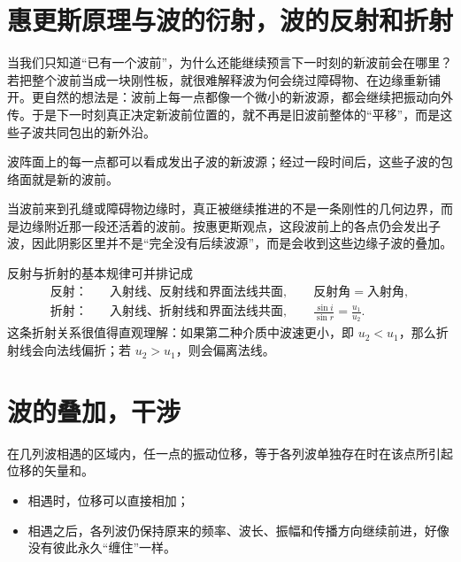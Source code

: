 \documentclass[lang=cn,11pt]{elegantbook}
\begin{document}
\section{惠更斯原理与波的衍射，波的反射和折射}

 当我们只知道“已有一个波前”，为什么还能继续预言下一时刻的新波前会在哪里？若把整个波前当成一块刚性板，就很难解释波为何会绕过障碍物、在边缘重新铺开。更自然的想法是：波前上每一点都像一个微小的新波源，都会继续把振动向外传。于是下一时刻真正决定新波前位置的，就不再是旧波前整体的“平移”，而是这些子波共同包出的新外沿。

\begin{theorem}[惠更斯原理]
波阵面上的每一点都可以看成发出子波的新波源；经过一段时间后，这些子波的包络面就是新的波前。
\end{theorem}

 当波前来到孔缝或障碍物边缘时，真正被继续推进的不是一条刚性的几何边界，而是边缘附近那一段还活着的波前。按惠更斯观点，这段波前上的各点仍会发出子波，因此阴影区里并不是“完全没有后续波源”，而是会收到这些边缘子波的叠加。

\begin{theorem}[波的反射和折射]
反射与折射的基本规律可并排记成
\[
\begin{aligned}
\text{反射：}\quad &\text{入射线、反射线和界面法线共面},\qquad \text{反射角}=\text{入射角},\\
\text{折射：}\quad &\text{入射线、折射线和界面法线共面},\qquad \frac{\sin i}{\sin r}=\frac{u_1}{u_2}.
\end{aligned}
\]这条折射关系很值得直观理解：如果第二种介质中波速更小，即 \(u_2<u_1\)，那么折射线会向法线偏折；若 \(u_2>u_1\)，则会偏离法线。
\end{theorem}


\section{波的叠加，干涉}

\begin{definition}[波的叠加原理]
在几列波相遇的区域内，任一点的振动位移，等于各列波单独存在时在该点所引起位移的矢量和。
\begin{itemize}
 \item 相遇时，位移可以直接相加；
 \item 相遇之后，各列波仍保持原来的频率、波长、振幅和传播方向继续前进，好像没有彼此永久“缠住”一样。
\end{itemize}
\end{definition}
\end{document}
